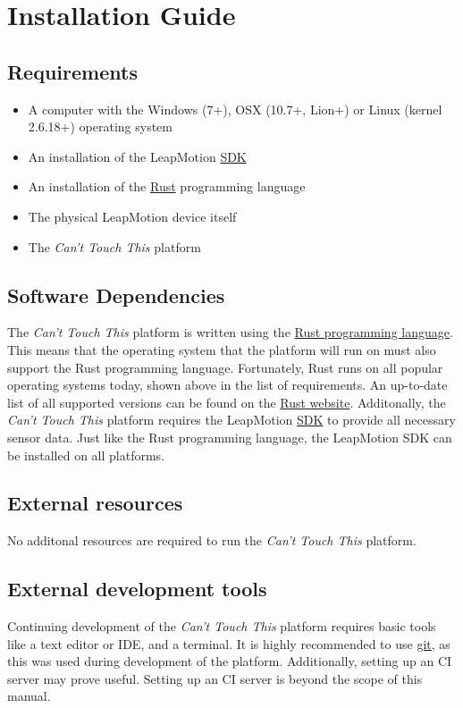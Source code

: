 \documentclass{standalone}
\begin{document}
  \section{Installation Guide}
  \subsection{Requirements}
  \begin{itemize}
    \tightlist{}
    \item A computer with the Windows (7+), OSX (10.7+, Lion+) or
      Linux (kernel 2.6.18+) operating system
    \item An installation of the LeapMotion
      \href{https://developer.leapmotion.com/sdk/v2}{SDK}
    \item An installation of the
      \href{https://rustup.rs}{Rust} programming language
    \item The physical LeapMotion device itself
    \item The \textit{Can't Touch This} platform
  \end{itemize}

  \subsection{Software Dependencies}
  The \textit{Can't Touch This} platform is written using the
  \href{https://rust-lang.org}{Rust programming language}. This means that the
  operating system that the platform will run on must also support the Rust
  programming language. Fortunately, Rust runs on all popular operating systems
  today, shown above in the list of requirements. An up-to-date list of all
  supported versions can be found on the
  \href{https://forge.rust-lang.org/platform-support.html}{Rust website}.
  Additonally, the \textit{Can't Touch This} platform requires the LeapMotion
  \href{https://developer.leapmotion.com/sdk/v2}{SDK} to provide all necessary
  sensor data. Just like the Rust programming language, the LeapMotion SDK can
  be installed on all platforms.

  \subsection{External resources}
  No additonal resources are required to run the \textit{Can't Touch This}
  platform.

  \subsection{External development tools}
  Continuing development of the \textit{Can't Touch This} platform requires
  basic tools like a text editor or IDE, and a terminal. It is highly
  recommended to use \href{https://git-scm.com/}{git}, as this was used during
  development of the platform. Additionally, setting up an CI server may prove
  useful. Setting up an CI server is beyond the scope of this manual.
  \clearpage
\end{document}
